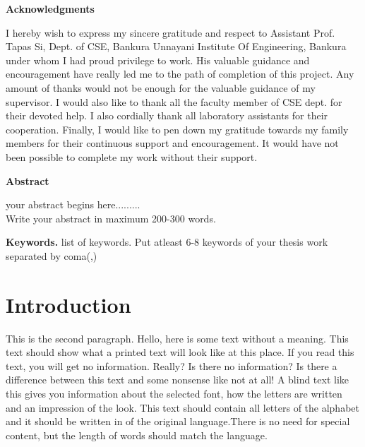 \documentclass[11pt, a4paper]{report}
\newcommand{\SupervisorName}{Tapas Si}
\begin{document}
\begin{center}
        \vspace*{1cm}
         \LARGE
        \textbf{Acknowledgments}
        
        \vspace{1.5cm}
 \justify      
		I hereby wish to express my sincere gratitude and respect to Assistant Prof. \SupervisorName, Dept. of CSE, Bankura Unnayani Institute Of Engineering, Bankura under whom I had proud privilege to work. His valuable guidance and encouragement have really led me to the path of completion of this project. Any amount of thanks would not be enough for the valuable guidance of my supervisor. 
I would also like to thank all the faculty member of CSE dept. for their devoted help. I also cordially thank all laboratory assistants for their cooperation.
Finally, I would like to pen down my gratitude towards my family members for their continuous support and encouragement. It would have not been possible to complete my work without their support.
   
        
     
        
        \vfill
        
       
        
        
        
    \end{center}
    


\newpage
\vspace*{1cm}
\begin{center}
\LARGE
\textbf{Abstract}
\end{center}

\justify
 your abstract begins here.........\\
 Write your abstract in maximum 200-300 words.
 
 \vspace*{1cm}
 \smallskip
\noindent \textbf{Keywords.} list of keywords.
 Put atleast 6-8 keywords of your thesis work separated by coma(,)
 

\newpage
\tableofcontents



\listoffigures


\newpage

\listoftables

\newpage
\chapter{Introduction}
This  is  the  second  paragraph. Hello, here is some text without 
a meaning.  This text should show what 
a printed text will look like at this place.  If you read this text, 
you will get no information.  Really?  Is there no information?  Is there 
a difference between this text and some nonsense like not at all!  A 
blind text like this gives you information about the selected font, how 
the letters are written and an impression of the look.  This text should
contain all letters of the alphabet and it should be written in of the
original language.There is no need for special content, but the length of
words should match the language.
\end{document}
